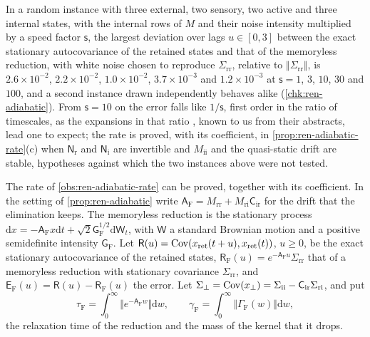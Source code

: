 \begin{observation}\label{obs:ren-adiabatic-rate}
In a random instance with three external, two sensory, two active and three internal states, with the internal rows of $M$ and their noise intensity multiplied by a speed factor $\mathsf s$, the largest deviation over lags $u\in[0,3]$ between the exact stationary autocovariance of the retained states and that of the memoryless reduction, with white noise chosen to reproduce $\Sigma_{\mathrm{rr}}$, relative to $\Vert\Sigma_{\mathrm{rr}}\Vert$, is $2.6\times10^{-2}$, $2.2\times10^{-2}$, $1.0\times10^{-2}$, $3.7\times10^{-3}$ and $1.2\times10^{-3}$ at $\mathsf s=1$, $3$, $10$, $30$ and $100$, and a second instance drawn independently behaves alike (\cref{chk:ren-adiabatic}). From $\mathsf s=10$ on the error falls like $1/\mathsf s$, first order in the ratio of timescales, as the expansions in that ratio \citep{vankampen1985elimination,geigenmuller1983systematic}, known to us from their abstracts, lead one to expect; the rate is proved, with its coefficient, in \cref{prop:ren-adiabatic-rate}(c) when $\mathsf N_{\mathrm r}$ and $\mathsf N_{\mathrm i}$ are invertible and $M_{\mathrm{ii}}$ and the quasi-static drift are stable, hypotheses against which the two instances above were not tested.
\end{observation}
The rate of \cref{obs:ren-adiabatic-rate} can be proved, together with its coefficient. In the setting of \cref{prop:ren-adiabatic} write $\mathsf A_{\mathrm F}=M_{\mathrm{rr}}+M_{\mathrm{ri}}\mathsf C_{\mathrm{ir}}$ for the drift that the elimination keeps. The memoryless reduction is the stationary process $\mathrm dx=-\mathsf A_{\mathrm F}x\mathrm dt+\sqrt2\mathsf G_{\mathrm F}^{1/2}\mathrm d\mathsf W_t$, with $\mathsf W$ a standard Brownian motion and a positive semidefinite intensity $\mathsf G_{\mathrm F}$. Let $\mathsf R(u)=\operatorname{Cov}(x_{\mathrm{ret}}(t+u),x_{\mathrm{ret}}(t))$, $u\ge0$, be the exact stationary autocovariance of the retained states, $\mathsf R_{\mathrm F}(u)=e^{-\mathsf A_{\mathrm F}u}\Sigma_{\mathrm{rr}}$ that of a memoryless reduction with stationary covariance $\Sigma_{\mathrm{rr}}$, and $\mathsf E_{\mathrm F}(u)=\mathsf R(u)-\mathsf R_{\mathrm F}(u)$ the error. Let $\Sigma_\perp=\operatorname{Cov}(x_\perp)=\Sigma_{\mathrm{ii}}-\mathsf C_{\mathrm{ir}}\Sigma_{\mathrm{ri}}$, and put
\begin{equation}\label{eq:ren-adiabatic-times}
\tau_{\mathrm F}=\int_0^\infty\bigl\Vert e^{-\mathsf A_{\mathrm F}w}\bigr\Vert\mathrm dw,\qquad\gamma_{\mathrm F}=\int_0^\infty\bigl\Vert\Gamma_{\mathrm F}(w)\bigr\Vert\mathrm dw,
\end{equation}
the relaxation time of the reduction and the mass of the kernel that it drops.

